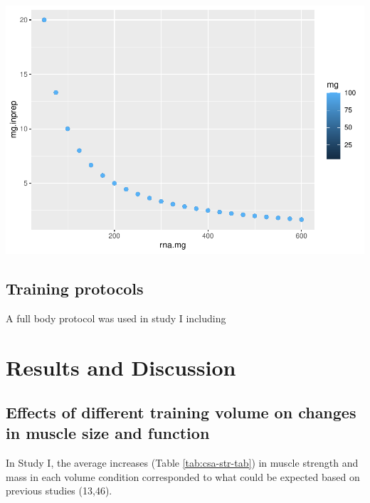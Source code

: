\documentclass[twoside,10pt]{gihclass} %
\begin{document}
\includegraphics{thesis_files/figure-latex/unnamed-chunk-1-1.pdf}

\hypertarget{training-protocols}{%
\section{Training protocols}\label{training-protocols}}

A full body protocol was used in study I including

\hypertarget{results-and-discussion}{%
\chapter{Results and Discussion}\label{results-and-discussion}}

\hypertarget{effects-of-different-training-volume-on-changes-in-muscle-size-and-function}{%
\section{Effects of different training volume on changes in muscle size and function}\label{effects-of-different-training-volume-on-changes-in-muscle-size-and-function}}

In Study I, the average increases (Table \ref{tab:csa-str-tab}) in muscle strength and mass in each volume condition corresponded to what could be expected based on previous studies
(13,46).
\end{document}
